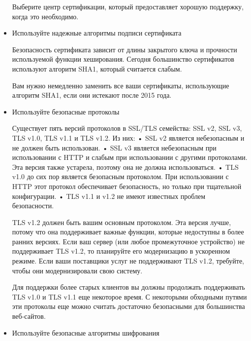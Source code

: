 \documentclass[11pt, a4paper]{article}		%
\begin{document}
\begin{itemize}
Выберите центр сертификации, который предоставляет хорошую поддержку, когда это необходимо.


\item Используйте надежные алгоритмы подписи сертификата

Безопасность сертификата зависит от длины закрытого ключа и прочности используемой функции хеширования. Сегодня большинство сертификатов используют алгоритм SHA1, который считается слабым. 

Вам нужно немедленно заменить все ваши сертификаты, использующие алгоритм SHA1, если они истекают после 2015 года.

\item Используйте безопасные протоколы

Существует пять версий протоколов в SSL/TLS семейства: SSL v2, SSL v3, TLS v1.0, TLS v1.1 и TLS v1.2. Из них:
• SSL v2 является небезопасным и не должен быть использован. 
• SSL v3 является небезопасным при использовании с HTTP и слабым при использовании с другими протоколами. Эта версия также устарела, поэтому она не должна использоваться.
• TLS v1.0 до сих пор является безопасным протоколом. При использовании с HTTP этот протокол обеспечивает безопасность, но только при тщательной конфигурации.
• TLS v1.1 и v1.2 не имеют известных проблем безопасности.

TLS v1.2 должен быть вашим основным протоколом. Эта версия лучше, потому что она поддерживает важные функции, которые недоступны в более ранних версиях. Если ваш сервер (или любое промежуточное устройство) не поддерживает TLS v1.2, то планируйте его модернизацию в ускоренном режиме. Если ваши поставщики услуг не поддерживают TLS v1.2, требуйте, чтобы они модернизировали свою систему.

Для поддержки более старых клиентов вы должны продолжать поддерживать TLS v1.0 и TLS v1.1 еще некоторое время. С некоторыми обходными путями эти протоколы еще можно считать достаточно безопасными для большинства веб-сайтов.

\item Используйте безопасные алгоритмы шифрования


\end{itemize}
\end{document}
